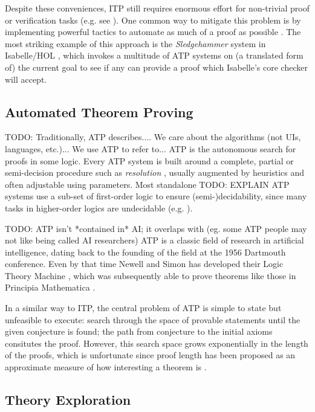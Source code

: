 \documentclass[]{article}
\begin{document}
Despite these conveniences, ITP still requires enormous effort for non-trivial proof or verification tasks (e.g. see \cite{hales2015formal}). One common way to mitigate this problem is by implementing powerful tactics to automate as much of a proof as possible \iffalse Adam Chlipala \fi. The most striking example of this approach is the \emph{Sledgehammer} system in Isabelle/HOL \cite{journals/iandc/MengQP06}, which invokes a multitude of ATP systems on (a translated form of) the current goal to see if any can provide a proof which Isabelle's core checker will accept.

\subsection{Automated Theorem Proving}
\label{itp}

TODO: Traditionally, ATP describes.... We care about the algorithms (not UIs, languages, etc.)... We use ATP to refer to...
ATP is the autonomous search for proofs in some logic. Every ATP system is built around a complete, partial or semi-decision procedure such as \emph{resolution} \cite[\S~9.6]{Russell:2003:AIM:773294}, usually augmented by heuristics and often adjustable using parameters. Most standalone TODO: EXPLAIN ATP systems use a sub-set of first-order logic \cite[\S~10]{Russell:2003:AIM:773294} to ensure (semi-)decidability, since many tasks in higher-order logics are undecidable (e.g. \cite{huet1973undecidability}).

TODO: ATP isn't *contained in* AI; it overlaps with (eg. some ATP people may not like being called AI researchers)
ATP is a classic field of research in artificial intelligence, dating back to the founding of the field at the 1956 Dartmouth conference. Even by that time Newell and Simon has developed their Logic Theory Machine \cite{newell1956logic}, which was subsequently able to prove theorems like those in Principia Mathematica \cite{newell1958elements}.

In a similar way to ITP, the central problem of ATP is simple to state but unfeasible to execute: search through the space of provable statements until the given conjecture is found; the path from conjecture to the initial axioms consitutes the proof. However, this search space grows exponentially in the length of the proofs, which is unfortunate since proof length has been proposed as an approximate measure of how interesting a theorem is \cite[\S~10.2.1]{colton2012automated}.

\subsection{Theory Exploration}
\end{document}
